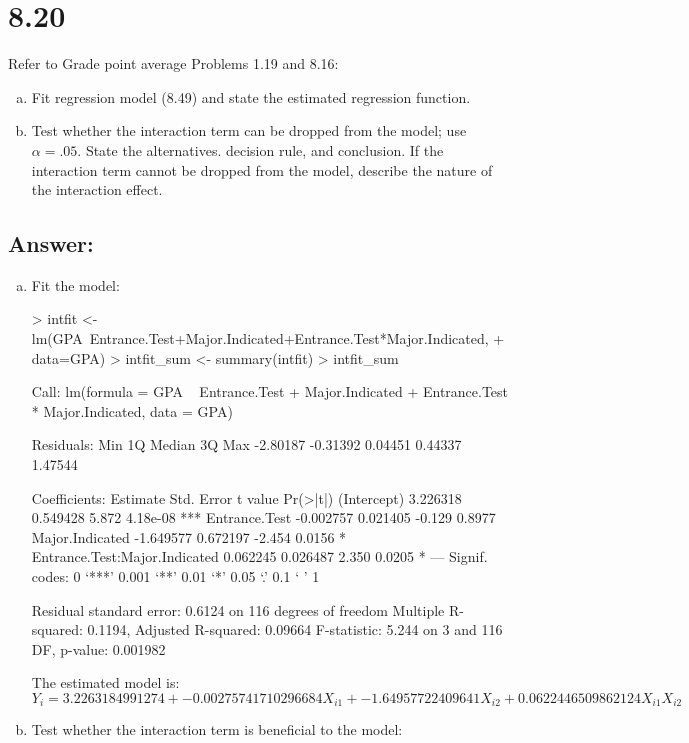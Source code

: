 \documentclass{article}
\begin{document}
\section{8.20}

Refer to Grade point average Problems 1.19 and 8.16:

\begin{enumerate}[a)]
\item{} Fit regression model (8.49) and state the estimated regression function.
\item{} Test whether the interaction term can be dropped from the model; use $\alpha{} = .05$. State the alternatives. decision rule, and conclusion. If the interaction term cannot be dropped from the model, describe the nature of the interaction effect.
\end{enumerate}

\subsection{Answer:}

\begin{enumerate}[a)]
\item{} Fit the model:

\begin{Schunk}
\begin{Sinput}
> intfit <- lm(GPA~Entrance.Test+Major.Indicated+Entrance.Test*Major.Indicated,
+              data=GPA)
> intfit_sum <- summary(intfit)
> intfit_sum
\end{Sinput}
\begin{Soutput}
Call:
lm(formula = GPA ~ Entrance.Test + Major.Indicated + Entrance.Test * 
    Major.Indicated, data = GPA)

Residuals:
     Min       1Q   Median       3Q      Max 
-2.80187 -0.31392  0.04451  0.44337  1.47544 

Coefficients:
                               Estimate Std. Error t value Pr(>|t|)    
(Intercept)                    3.226318   0.549428   5.872 4.18e-08 ***
Entrance.Test                 -0.002757   0.021405  -0.129   0.8977    
Major.Indicated               -1.649577   0.672197  -2.454   0.0156 *  
Entrance.Test:Major.Indicated  0.062245   0.026487   2.350   0.0205 *  
---
Signif. codes:  0 ‘***’ 0.001 ‘**’ 0.01 ‘*’ 0.05 ‘.’ 0.1 ‘ ’ 1

Residual standard error: 0.6124 on 116 degrees of freedom
Multiple R-squared:  0.1194,	Adjusted R-squared:  0.09664 
F-statistic: 5.244 on 3 and 116 DF,  p-value: 0.001982
\end{Soutput}
\end{Schunk}

The estimated model is:
$$ Y_i = 3.2263184991274 + -0.00275741710296684X_{i1} + -1.64957722409641X_{i2} + 0.0622446509862124X_{i1}X_{i2} $$

\item{} Test whether the interaction term is beneficial to the model:




\end{enumerate}
\end{document}
